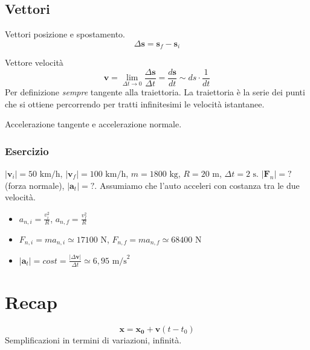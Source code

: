 \subsection{Vettori}
Vettori posizione e spostamento.
\[ \Delta\mathbf{s} = \mathbf{s}_f - \mathbf{s}_i \]

Vettore velocità
\[ \mathbf{v} = \lim_{\Delta t \to 0}\frac{\Delta\mathbf{s}}{\Delta t} = \frac{d\mathbf{s}}{dt} \sim ds\cdot\frac{1}{dt} \]
Per definizione \textit{sempre} tangente alla traiettoria. La traiettoria
è la serie dei punti che si ottiene percorrendo per tratti infinitesimi le
velocità istantanee.

Accelerazione tangente e accelerazione normale.


\subsubsection*{Esercizio}
$|\mathbf{v}_i| = 50\text{ km/h}$, $|\mathbf{v}_f| = 100\text{ km/h}$,
$m = 1800\text{ kg}$, $R = 20\text{ m}$, $\Delta t = 2\text{ s}$. $|\mathbf{F}_n| = ?$ (forza normale),
$|\mathbf{a}_t| = ?$. Assumiamo che l'auto acceleri con costanza tra le
due velocità.

\begin{itemize}
    \item $a_{n,i} = \frac{v_i^2}{R}$, $a_{n,f} = \frac{v_f^2}{R}$
    \item $F_{n,i} = ma_{n,i} \simeq 17100 \text{ N}$, $F_{n,f} = ma_{n,f} \simeq 68400\text{ N}$
    \item $|\mathbf{a}_t| = \textit{cost} = \frac{|\Delta\mathbf{v}|}{\Delta t} \simeq 6,95\text{ m/s}^2$
\end{itemize}

\section*{Recap}
\[ \mathbf{x} = \mathbf{x_0} + \mathbf{v}(t - t_0) \]
Semplificazioni in termini di variazioni, infinità.